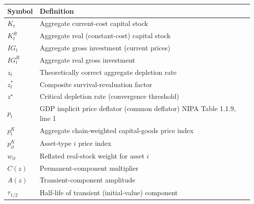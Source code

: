 \begin{center}
\small
\begin{tabular}{ll}
  \hline\hline
  Symbol & Definition \\
  \hline
  $K_t$ & Aggregate current-cost capital stock \\
  $K_t^{R}$ & Aggregate real (constant-cost) capital stock \\
  $IG_t$ & Aggregate gross investment (current prices) \\
  $IG_t^{R}$ & Aggregate real gross investment \\
  $z_t$ & Theoretically correct aggregate depletion rate \\
  $z_t^{\ast}$ & Composite survival-revaluation factor \\
  $z^{\star}$ & Critical depletion rate (convergence threshold) \\
  $p_t$   & GDP implicit price deflator (common deflator)  NIPA Table 1.1.9, line 1 \\
  $p_t^{K}$ & Aggregate chain-weighted capital-goods price index \\
  $p_{it}^{K}$ & Asset-type $i$ price index \\
  $w_{it}$ & Reflated real-stock weight for asset $i$ \\
  $C(z)$ & Permanent-component multiplier \\
  $A(z)$ & Transient-component amplitude \\
  $\tau_{1/2}$ & Half-life of transient (initial-value) component \\
  \hline
\end{tabular}
\end{center}
